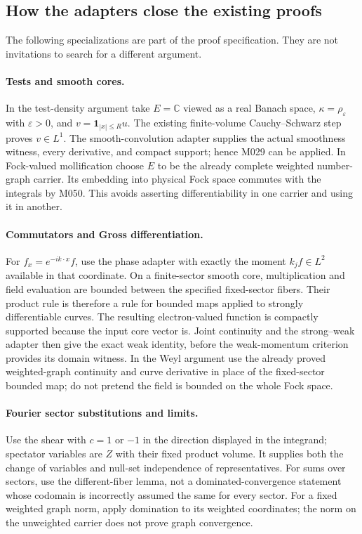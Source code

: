 \documentclass[11pt,a4paper]{article}
\theoremstyle{definition}
\theoremstyle{remark}
\begin{document}
\subsection{How the adapters close the existing proofs}
\label{sec:adapter-call-sites}
The following specializations are part of the proof specification.
They are not invitations to search for a different argument.

\paragraph{Tests and smooth cores.}
In the test-density argument take $E=\mathbb C$ viewed as a real Banach
space, $\kappa=\rho_\varepsilon$ with $\varepsilon>0$, and
$v=\mathbf1_{|x|\leq R}u$. The existing finite-volume
Cauchy--Schwarz step proves $v\in L^1$. The smooth-convolution adapter
supplies the actual smoothness witness, every derivative, and compact
support; hence M029 can be applied. In Fock-valued mollification choose
$E$ to be the already complete weighted number-graph carrier. Its
embedding into physical Fock space commutes with the integrals by M050.
This avoids asserting differentiability in one carrier and using it
in another.

\paragraph{Commutators and Gross differentiation.}
For $f_x=e^{-ik\cdot x}f$, use the phase adapter with exactly the moment
$k_jf\in L^2$ available in that coordinate. On a finite-sector smooth
core, multiplication and field evaluation are bounded between the
specified fixed-sector fibers. Their product rule is therefore a rule
for bounded maps applied to strongly differentiable curves.
The resulting electron-valued function is compactly supported because
the input core vector is. Joint continuity and the strong--weak adapter
then give the exact weak identity, before the weak-momentum criterion
provides its domain witness. In the Weyl argument use the already
proved weighted-graph continuity and curve derivative in place of the
fixed-sector bounded map; do not pretend the field is bounded on the
whole Fock space.

\paragraph{Fourier sector substitutions and limits.}
Use the shear with $c=1$ or $-1$ in the direction displayed in the
integrand; spectator variables are $Z$ with their fixed product volume.
It supplies both the change of variables and null-set independence of
representatives. For sums over sectors, use the different-fiber lemma,
not a dominated-convergence statement whose codomain is incorrectly
assumed the same for every sector. For a fixed weighted graph norm,
apply domination to its weighted coordinates; the norm on the
unweighted carrier does not prove graph convergence.
\end{document}
